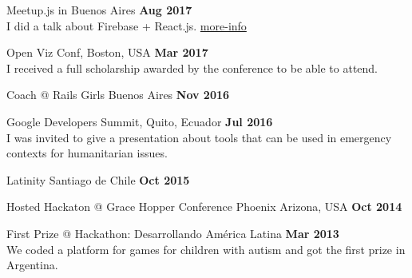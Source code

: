 \documentclass[margin,line]{resume}
\begin{document}
\begin{resume}
\begin{list2}
\item Meetup.js in Buenos Aires \hfill \textbf{Aug 2017}
\\
I did a talk about Firebase + React.js. \href{https://www.meetup.com/Meetup-js/events/242439836/?eventId=242439836}{more-info}



\item Open Viz Conf, Boston, USA \hfill \textbf{Mar 2017}
\\ I received a full scholarship awarded by the conference to be able to attend.

\item Coach  @ Rails Girls Buenos Aires \hfill \textbf{Nov 2016}

\item  Google Developers Summit, Quito, Ecuador \hfill \textbf{Jul 2016}  \\
I was invited to give a presentation about tools that can be used in emergency contexts for humanitarian issues.

\item  Latinity Santiago de Chile \textbf{Oct 2015}

\item Hosted Hackaton @ Grace Hopper Conference Phoenix Arizona, USA \hfill \textbf{Oct 2014} 

\item First Prize @ Hackathon: Desarrollando Am\'erica Latina \hfill \textbf{Mar 2013} \\
We coded a platform for games for children with autism and got the first prize in Argentina.
\end{list2}



    

\end{resume}
\end{document}
